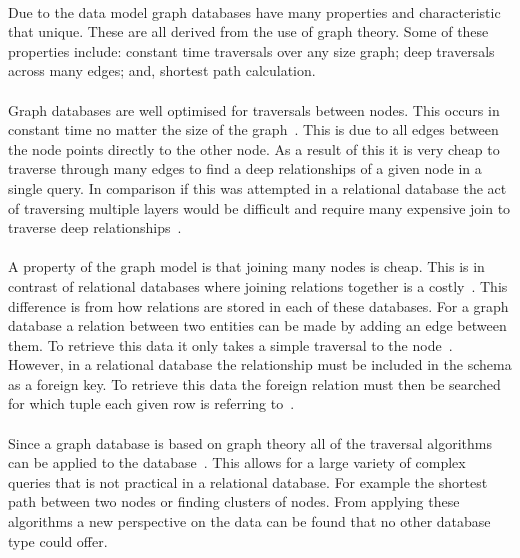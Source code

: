 \documentclass{CRPITStyle}
\renewcommand{\cite}{\citep}
\begin{document}
\paragraph{}
Due to the data model graph databases have many properties and
characteristic that unique.
These are all derived from the use of graph theory.
Some of these properties include:
constant time traversals over any size graph;
deep traversals across many edges;
and, shortest path calculation.

\paragraph{}
Graph databases are well optimised for traversals between nodes.
This occurs in constant time no matter the size of the graph~\cite{sql_nosql}.
This is due to all edges between the node points directly
to the other node.
As a result of this it is very cheap to traverse through many
edges to find a deep relationships of a given node in a single
query.
In comparison if this was attempted in a relational database
the act of traversing multiple layers would be difficult and
require many expensive join to traverse deep
relationships~\cite{sql_nosql_gap,relational_db,neo4j}.

\paragraph{}
A property of the graph model is that joining many nodes is cheap.
This is in contrast of relational databases where joining relations
together is a costly~\cite{relational_db}.
This difference is from how relations are stored in each of these
databases.
For a graph database a relation between two entities can be made
by adding an edge between them.
To retrieve this data it only takes a simple traversal to the
node~\cite{neo4j}.
However, in a relational database the relationship must be included
in the schema as a foreign key.
To retrieve this data the foreign relation must then be searched for
which tuple each given row is referring to~\cite{relational_db}.

\paragraph{}
Since a graph database is based on graph theory all of the
traversal algorithms can be applied to the database~\cite{sql_nosql}.
This allows for a large variety of complex queries that is
not practical in a relational database.
For example the shortest path between two nodes or finding
clusters of nodes.
From applying these algorithms a new perspective on the data can
be found that no other database type could offer.
\end{document}
